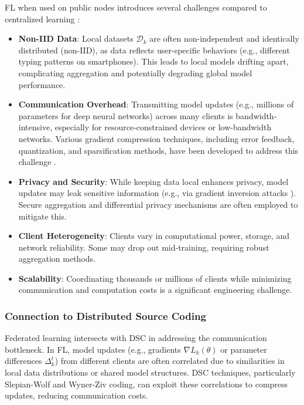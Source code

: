 FL when used on public nodes introduces several challenges compared to centralized learning \cite{McMahan2017FedAvg}:

\begin{itemize}
    \item \textbf{Non-IID Data}: Local datasets $\mathcal{D}_k$ are often non-independent and identically distributed (non-IID), as data reflects user-specific behaviors (e.g., different typing patterns on smartphones). This leads to local models drifting apart, complicating aggregation and potentially degrading global model performance.
    \item \textbf{Communication Overhead}: Transmitting model updates (e.g., millions of parameters for deep neural networks) across many clients is bandwidth-intensive, especially for resource-constrained devices or low-bandwidth networks. Various gradient compression techniques, including error feedback, quantization, and sparsification methods, have been developed to address this challenge \cite{Jiang2018LinearSpeedup}.
    \item \textbf{Privacy and Security}: While keeping data local enhances privacy, model updates may leak sensitive information (e.g., via gradient inversion attacks \cite{Zhu2019DeepLeakage}). Secure aggregation and differential privacy mechanisms are often employed to mitigate this.
    \item \textbf{Client Heterogeneity}: Clients vary in computational power, storage, and network reliability. Some may drop out mid-training, requiring robust aggregation methods.
    \item \textbf{Scalability}: Coordinating thousands or millions of clients while minimizing communication and computation costs is a significant engineering challenge.
\end{itemize}

\subsubsection{Connection to Distributed Source Coding}

Federated learning intersects with DSC in addressing the communication bottleneck. In FL, model updates (e.g., gradients $\nabla L_k(\theta)$ or parameter differences $\Delta_k^t$) from different clients are often correlated due to similarities in local data distributions or shared model structures. DSC techniques, particularly Slepian-Wolf and Wyner-Ziv coding, can exploit these correlations to compress updates, reducing communication costs.

